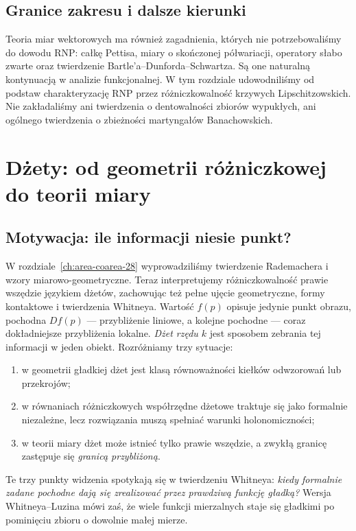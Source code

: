 \documentclass[11pt,a4paper,oneside]{book}
\numberwithin{equation}{chapter}
\theoremstyle{plain}
\theoremstyle{definition}
\theoremstyle{remark}
\begin{document}
\section{Granice zakresu i dalsze kierunki}
Teoria miar wektorowych ma również zagadnienia,
których nie potrzebowaliśmy do dowodu RNP:
całkę Pettisa, miary o skończonej półwariacji,
operatory słabo zwarte oraz twierdzenie
Bartle'a--Dunforda--Schwartza.
Są one naturalną kontynuacją w analizie funkcjonalnej.
W tym rozdziale udowodniliśmy od podstaw
charakteryzację RNP przez różniczkowalność krzywych
Lipschitzowskich. Nie zakładaliśmy ani twierdzenia
o dentowalności zbiorów wypukłych, ani ogólnego
twierdzenia o zbieżności martyngałów Banachowskich.



\chapter{Dżety: od geometrii różniczkowej do teorii miary}
\label{ch:dzety}

\section{Motywacja: ile informacji niesie punkt?}
W rozdziale~\ref{ch:area-coarea-28} wyprowadziliśmy twierdzenie
Rademachera i wzory miarowo-geometryczne. Teraz interpretujemy
różniczkowalność prawie wszędzie językiem dżetów, zachowując też
pełne ujęcie geometryczne, formy kontaktowe i twierdzenia Whitneya.
Wartość $f(p)$ opisuje jedynie punkt obrazu, pochodna $Df(p)$ ---
przybliżenie liniowe, a kolejne pochodne --- coraz dokładniejsze
przybliżenia lokalne. \emph{Dżet rzędu $k$} jest sposobem zebrania
tej informacji w jeden obiekt. Rozróżniamy trzy sytuacje:
\begin{enumerate}
\item w geometrii gładkiej dżet jest klasą równoważności
kiełków odwzorowań lub przekrojów;
\item w równaniach różniczkowych współrzędne dżetowe
traktuje się jako formalnie niezależne, lecz rozwiązania
muszą spełniać warunki holonomiczności;
\item w teorii miary dżet może istnieć tylko prawie wszędzie,
a zwykłą granicę zastępuje się \emph{granicą przybliżoną}.
\end{enumerate}
Te trzy punkty widzenia spotykają się w twierdzeniu Whitneya:
\emph{kiedy formalnie zadane pochodne dają się zrealizować przez
prawdziwą funkcję gładką?} Wersja Whitneya--Luzina mówi zaś,
że wiele funkcji mierzalnych staje się gładkimi po pominięciu
zbioru o dowolnie małej mierze.
\end{document}
